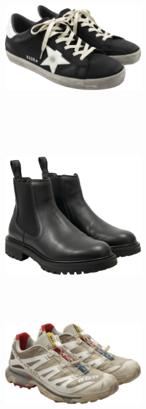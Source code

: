 \documentclass[10pt]{article}
\begin{document}
\begin{minipage}[c][59.33mm][c]{59.33mm}
\includegraphics[width=59.33mm,height=59.33mm,keepaspectratio]{assets/shoes/golden-goose-nere.png}\
\end{minipage}\
\vspace*{6.00mm}\
\begin{minipage}[c][59.33mm][c]{59.33mm}\centering
\includegraphics[width=59.33mm,height=59.33mm,keepaspectratio]{assets/shoes/black-chelsea-boots.png}\
\end{minipage} \hspace*{6.00mm} \begin{minipage}[c][59.33mm][c]{59.33mm}\centering
\includegraphics[width=59.33mm,height=59.33mm,keepaspectratio]{assets/shoes/salomon-xt-4-og.png}\
\end{minipage}\
\newpage
\end{document}
